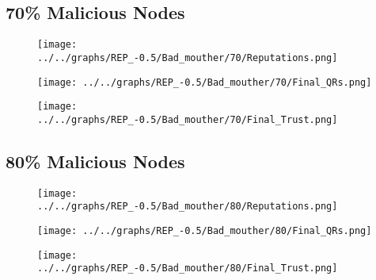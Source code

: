 \begin{minipage}[t]{0.49\columnwidth}
\subsection*{70\% Malicious Nodes}
    \begin{figure}[H]
        \centering
        \texttt{[image: ../../graphs/REP\_-0.5/Bad\_mouther/70/Reputations.png]}
    \end{figure}
    \begin{figure}[H]
        \centering
        \texttt{[image: ../../graphs/REP\_-0.5/Bad\_mouther/70/Final\_QRs.png]}
    \end{figure}
\end{minipage}
\begin{minipage}[t]{0.49\columnwidth}
    \begin{figure}[H]
        \centering
        \texttt{[image: ../../graphs/REP\_-0.5/Bad\_mouther/70/Final\_Trust.png]}
    \end{figure}
\end{minipage}

\begin{minipage}[t]{0.49\columnwidth}
\subsection*{80\% Malicious Nodes}
    \begin{figure}[H]
        \centering
        \texttt{[image: ../../graphs/REP\_-0.5/Bad\_mouther/80/Reputations.png]}
    \end{figure}
    \begin{figure}[H]
        \centering
        \texttt{[image: ../../graphs/REP\_-0.5/Bad\_mouther/80/Final\_QRs.png]}
    \end{figure}
\end{minipage}
\begin{minipage}[t]{0.49\columnwidth}
    \begin{figure}[H]
        \centering
        \texttt{[image: ../../graphs/REP\_-0.5/Bad\_mouther/80/Final\_Trust.png]}
    \end{figure}
\end{minipage}

